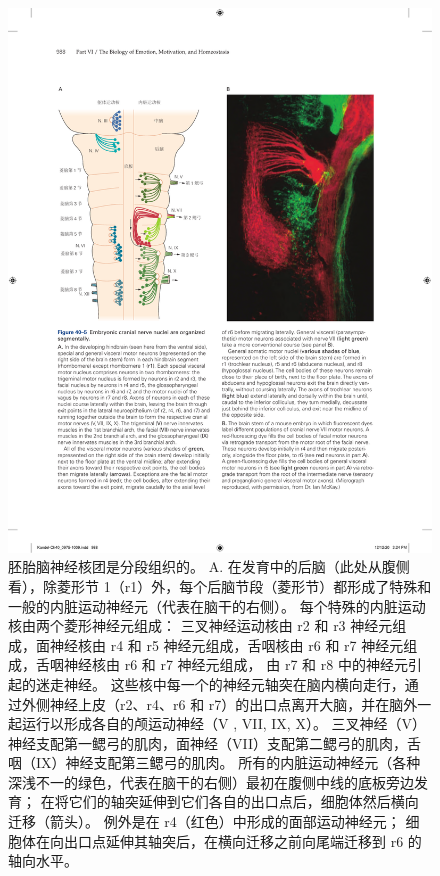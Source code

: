 \begin{figure}[htbp]
	\centering
	\includegraphics[width=1.0\linewidth]{chap40/fig_40_5}
	\caption{胚胎脑神经核团是分段组织的。
		A. 在发育中的后脑（此处从腹侧看），除菱形节 1（r1）外，每个后脑节段（菱形节）都形成了特殊和一般的内脏运动神经元（代表在脑干的右侧）。
		每个特殊的内脏运动核由两个菱形神经元组成：
		三叉神经运动核由 r2 和 r3 神经元组成，面神经核由 r4 和 r5 神经元组成，舌咽核由 r6 和 r7 神经元组成，舌咽神经核由 r6 和 r7 神经元组成， 由 r7 和 r8 中的神经元引起的迷走神经。
		这些核中每一个的神经元轴突在脑内横向走行，通过外侧神经上皮（r2、r4、r6 和 r7）的出口点离开大脑，并在脑外一起运行以形成各自的颅运动神经（V , VII, IX, X）。
		三叉神经（V）神经支配第一鳃弓的肌肉，面神经（VII）支配第二鳃弓的肌肉，舌咽（IX）神经支配第三鳃弓的肌肉。
		所有的内脏运动神经元（各种深浅不一的绿色，代表在脑干的右侧）最初在腹侧中线的底板旁边发育； 
		在将它们的轴突延伸到它们各自的出口点后，细胞体然后横向迁移（箭头）。
		例外是在 r4（红色）中形成的面部运动神经元；
		细胞体在向出口点延伸其轴突后，在横向迁移之前向尾端迁移到 r6 的轴向水平。
}
\end{figure}
